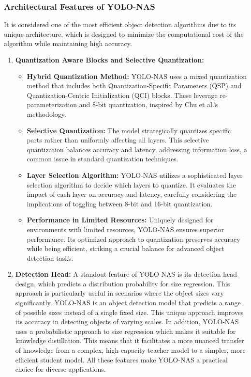 \subsubsection{Architectural Features of YOLO-NAS} \vspace{0mm}It is considered one of the most efficient object detection algorithms due to its unique architecture, which is designed to minimize the computational cost of the algorithm while maintaining high accuracy.
\begin{enumerate}
    \item \textbf{Quantization Aware Blocks and Selective Quantization: } 
        \begin{itemize}
            \item \textbf{Hybrid Quantization Method: } YOLO-NAS uses a mixed quantization method that includes both Quantization-Specific Parameters (QSP) and Quantization-Centric Initialization (QCI) blocks. These leverage re-parameterization and 8-bit quantization, inspired by Chu et al.'s methodology.
            \item  \textbf{Selective Quantization:} The model strategically quantizes specific parts rather than uniformly affecting all layers. This selective quantization balances accuracy and latency, addressing information loss, a common issue in standard quantization techniques.
                \item \textbf{Layer Selection Algorithm:} YOLO-NAS utilizes a sophisticated layer selection algorithm to decide which layers to quantize. It evaluates the impact of each layer on accuracy and latency, carefully considering the implications of toggling between 8-bit and 16-bit quantization.
                \item \textbf{Performance in Limited Resources:} Uniquely designed for environments with limited resources, YOLO-NAS ensures superior performance. Its optimized approach to quantization preserves accuracy while being efficient, striking a crucial balance for advanced object detection tasks.
        \end{itemize}
    \item \textbf{Detection Head: } A standout feature of YOLO-NAS is its detection head design, which predicts a distribution probability for size regression. This approach is particularly useful in scenarios where the object sizes vary significantly. YOLO-NAS is an object detection model that predicts a range of possible sizes instead of a single fixed size. This unique approach improves its accuracy in detecting objects of varying scales. In addition, YOLO-NAS uses a probabilistic approach to size regression which makes it suitable for knowledge distillation. This means that it facilitates a more nuanced transfer of knowledge from a complex, high-capacity teacher model to a simpler, more efficient student model. All these features make YOLO-NAS a practical choice for diverse applications.

\end{enumerate}
